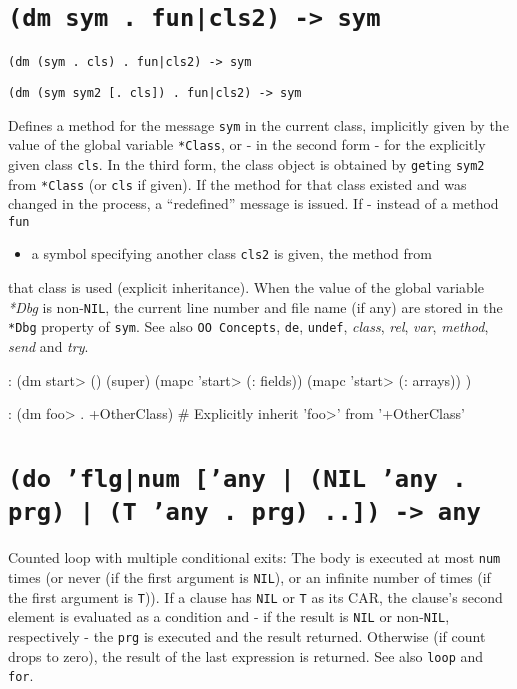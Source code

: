 { 
\section*{\texttt{(dm sym . fun|cls2) -> sym}}
\label{sec:func-ref-D-(dm sym . fun|cls2) -> sym}


\texttt{(dm (sym . cls) . fun|cls2) -> sym}

\texttt{(dm (sym sym2 [. cls]) . fun|cls2) -> sym}

Defines a method for the message \texttt{sym} in the current class,
implicitly given by the value of the global variable \texttt{*Class},
or - in the second form - for the explicitly given class \texttt{cls}.
In the third form, the class object is obtained by \texttt{get}ing
\texttt{sym2} from \texttt{*Class} (or \texttt{cls} if given). If the
method for that class existed and was changed in the process, a
``redefined'' message is issued. If - instead of a method \texttt{fun}
\begin{itemize}
\item a symbol specifying another class \texttt{cls2} is given, the method from
\end{itemize}
that class is used (explicit inheritance). When the value of the global
variable \emph{*Dbg} is non-\texttt{NIL}, the current line number
and file name (if any) are stored in the \texttt{*Dbg} property of \texttt{sym}. See
also \texttt{OO Concepts}, \texttt{de}, \texttt{undef}, \emph{class},
\emph{rel}, \emph{var},
\emph{method}, \emph{send} and
\emph{try}.


\begin{wideverbatim}
: (dm start> ()
   (super)
   (mapc 'start> (: fields))
   (mapc 'start> (: arrays)) )

: (dm foo> . +OtherClass)  # Explicitly inherit 'foo>' from '+OtherClass'
\end{wideverbatim}

 
\section*{\texttt{(do 'flg|num ['any | (NIL 'any . prg) | (T 'any . prg) ..]) -> any}}
\label{sec:func-ref-D-(do 'flg|num ['any | (NIL 'any . prg) | (T 'any . prg) ..]) -> any}


Counted loop with multiple conditional exits: The body is executed at
most \texttt{num} times (or never (if the first argument is \texttt{NIL}), or an
infinite number of times (if the first argument is \texttt{T})). If a clause
has \texttt{NIL} or \texttt{T} as its CAR, the clause's second element is evaluated as
a condition and - if the result is \texttt{NIL} or non-\texttt{NIL}, respectively -
the \texttt{prg} is executed and the result returned. Otherwise (if count drops
to zero), the result of the last expression is returned. See also \texttt{loop}
and \texttt{for}.


}

